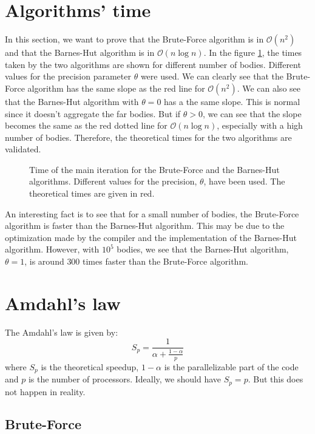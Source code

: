 \documentclass[11pt,a4paper]{article}
\begin{document}
\section{Algorithms' time}

In this section, we want to prove that the Brute-Force algorithm is in $\mathcal{O}(n^2)$ and that the Barnes-Hut algorithm is in $\mathcal{O}(n\log n)$. In the figure \ref{fig:algo_time}, the times taken by the two algorithms are shown for different number of bodies. Different values for the precision parameter $\theta$ were used. We can clearly see that the Brute-Force algorithm has the same slope as the red line for $\mathcal{O}(n^2)$. We can also see that the Barnes-Hut algorithm with $\theta=0$ has a the same slope. This is normal since it doesn't aggregate the far bodies. But if $\theta>0$, we can see that the slope becomes the same as the red dotted line for $\mathcal{O}(n\log n)$, especially with a high number of bodies. Therefore, the theoretical times for the two algorithms are validated.

\begin{figure}[H]
\centering

\caption{\label{fig:algo_time} Time of the main iteration for the Brute-Force and the Barnes-Hut algorithms. Different values for the precision, $\theta$, have been used. The theoretical times are given in red.}
\end{figure}

An interesting fact is to see that for a small number of bodies, the Brute-Force algorithm is faster than the Barnes-Hut algorithm. This may be due to the optimization made by the compiler and the implementation of the Barnes-Hut algorithm. However, with $10^5$ bodies, we see that the Barnes-Hut algorithm, $\theta=1$, is around $300$ times faster than the Brute-Force algorithm.

\section{Amdahl's law}

The Amdahl's law is given by:
\begin{equation}
S_{p} = \frac{1}{\alpha + \frac{1-\alpha}{p}}
\end{equation}
where $S_{p}$ is the theoretical speedup, $1-\alpha$ is the parallelizable part of the code and $p$ is the number of processors. Ideally, we should have $S_p = p$. But this does not happen in reality.

\subsection{Brute-Force}
\end{document}
